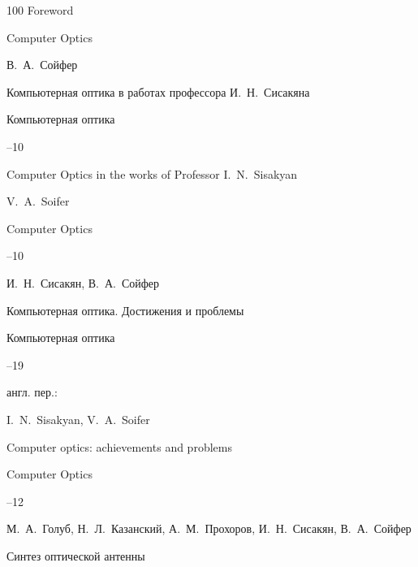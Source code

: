 \begin{thebibliography}{100}
\paper Foreword

\jour Computer Optics










\by В.~А.~Сойфер

\paper Компьютерная оптика в работах профессора И.~Н.~Сисакяна

\jour Компьютерная оптика



--10

\misctransl

\paper Computer Optics in the works of Professor I.~N.~Sisakyan

\by V.~A.~Soifer

\jour Computer Optics



--10






\by И.~Н.~Сисакян, В.~А.~Сойфер

\paper Компьютерная оптика. Достижения и проблемы

\jour Компьютерная оптика



--19

\transl англ. пер.:~

\by I.~N.~Sisakyan, V.~A.~Soifer

\paper Computer optics: achievements and problems

\jour Computer Optics




--12






\by  М.~А.~Голуб, Н.~Л.~Казанский, А.~М.~Прохоров, И.~Н.~Сисакян, В.~А.~Сойфер

\paper Синтез оптической антенны


\end{thebibliography}
